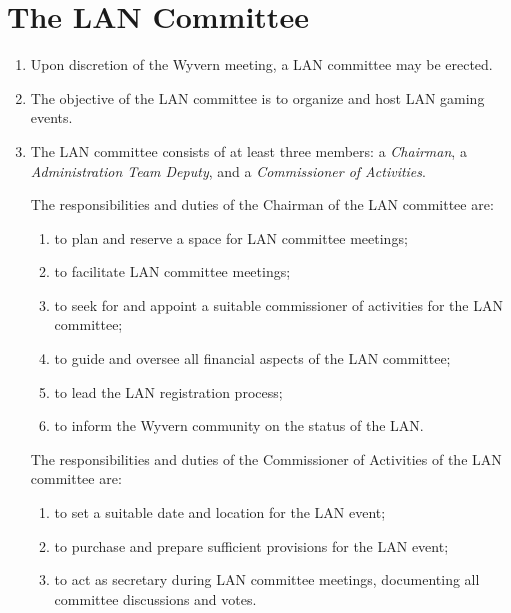\section{The LAN Committee}

\begin{enumerate}
	\item Upon discretion of the Wyvern meeting, a LAN committee may be erected.
	
    \item The objective of the LAN committee is to organize and host LAN gaming events.
    
	\item The LAN committee consists of at least three members: a \textit{Chairman}, a \textit{Administration Team Deputy}, and a \textit{Commissioner of Activities}.

    \begin{item}
        The responsibilities and duties of the Chairman of the LAN committee are:
        \begin{enumerate}
            \item to plan and reserve a space for LAN committee meetings;
            \item to facilitate LAN committee meetings;
            \item to seek for and appoint a suitable commissioner of activities for the LAN committee;
            \item to guide and oversee all financial aspects of the LAN committee;
            \item to lead the LAN registration process;
            \item to inform the Wyvern community on the status of the LAN.
        \end{enumerate}
    \end{item}
    
    \begin{item}
        The responsibilities and duties of the Commissioner of Activities of the LAN committee are:
        \begin{enumerate}
            \item to set a suitable date and location for the LAN event;
            \item to purchase and prepare sufficient provisions for the LAN event;
            \item to act as secretary during LAN committee meetings, documenting all committee discussions and votes.
        \end{enumerate}
    \end{item}
    

\end{enumerate}
